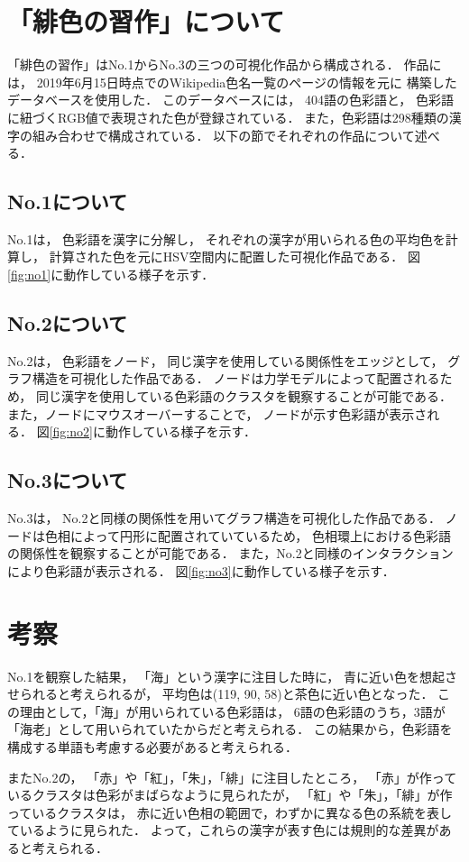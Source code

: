 \documentclass[a4j,twocolumn]{ujarticle} %
\newcommand{\workname}{緋色の習作}
\newcommand{\colorname}{色彩語}
\newcommand{\mysection}[1]{\vspace{-23pt}\section{#1}\vspace{-5pt}}
\newcommand{\mysubsection}[1]{\vspace{-19pt}\subsection{#1}\vspace{-5pt}}
\begin{document}
\vspace{-1zh}

\section{「\workname{}」について}

「\workname{}」はNo.1からNo.3の三つの可視化作品から構成される．
作品には，
2019年6月15日時点でのWikipedia色名一覧のページ\cite{WikiColorName}の情報を元に
構築したデータベースを使用した．
このデータベースには，
404語の\colorname{}と，
\colorname{}に紐づくRGB値で表現された色が登録されている．
また，\colorname{}は298種類の漢字の組み合わせで構成されている．
以下の節でそれぞれの作品について述べる．

\mysubsection{No.1について}

No.1は，
\colorname{}を漢字に分解し，
それぞれの漢字が用いられる色の平均色を計算し，
計算された色を元にHSV空間内に配置した可視化作品である．
図\ref{fig:no1}に動作している様子を示す．

\mysubsection{No.2について}

No.2は，
\colorname{}をノード，
同じ漢字を使用している関係性をエッジとして，
グラフ構造を可視化した作品である．
ノードは力学モデルによって配置されるため，
同じ漢字を使用している\colorname{}のクラスタを観察することが可能である．
また，ノードにマウスオーバーすることで，
ノードが示す\colorname{}が表示される．
図\ref{fig:no2}に動作している様子を示す．

\mysubsection{No.3について}

No.3は，
No.2と同様の関係性を用いてグラフ構造を可視化した作品である．
ノードは色相によって円形に配置されていているため，
色相環上における\colorname{}の関係性を観察することが可能である．
また，No.2と同様のインタラクションにより\colorname{}が表示される．
図\ref{fig:no3}に動作している様子を示す．

\mysection{考察}
\label{consideration}

No.1を観察した結果，
「海」という漢字に注目した時に，
青に近い色を想起させられると考えられるが，
平均色は(119, 90, 58)と茶色に近い色となった．
この理由として，「海」が用いられている\colorname{}は，
6語の\colorname{}のうち，3語が「海老」として用いられていたからだと考えられる．
この結果から，\colorname{}を構成する単語も考慮する必要があると考えられる．

またNo.2の，
「赤」や「紅」，「朱」，「緋」に注目したところ，
「赤」が作っているクラスタは色彩がまばらなように見られたが，
「紅」や「朱」，「緋」が作っているクラスタは，
赤に近い色相の範囲で，わずかに異なる色の系統を表しているように見られた．
よって，これらの漢字が表す色には規則的な差異があると考えられる．
\end{document}
